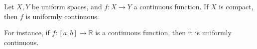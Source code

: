\documentclass[12pt]{article}
\begin{document}
Let $X,Y$ be uniform spaces, and $f: X \rightarrow Y$ a continuous function. If $X$ is compact, then $f$ is uniformly continuous.

For instance, if $f: [a,b] \rightarrow \mathbb{R}$ is a continuous function, then it is uniformly continuous.
\end{document}
